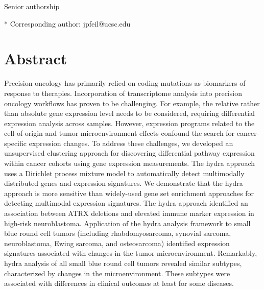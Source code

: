 \documentclass[10pt,letterpaper]{article}
\begin{document}
\begin{flushleft}
% 
%

\ddag Senior authorship




* Corresponding author: jpfeil@ucsc.edu

\end{flushleft}
\section*{Abstract}
Precision oncology has primarily relied on coding mutations as biomarkers of response to therapies. Incorporation of transcriptome analysis into precision oncology workflows has proven to be challenging. For example, the relative rather than absolute gene expression level needs to be considered, requiring differential expression analysis across samples. However, expression programs related to the cell-of-origin and tumor microenvironment effects confound the search for cancer-specific expression changes. To address these challenges, we developed an unsupervised clustering approach for discovering differential pathway expression within cancer cohorts using gene expression measurements. The hydra approach uses a Dirichlet process mixture model to automatically detect multimodally distributed genes and expression signatures. We demonstrate that the hydra approach is more sensitive than widely-used gene set enrichment approaches for detecting multimodal expression signatures. The hydra approach identified an association between ATRX deletions and elevated immune marker expression in high-risk neuroblastoma. Application of the hydra analysis framework to small blue round cell tumors (including rhabdomyosarcoma, synovial sarcoma, neuroblastoma, Ewing sarcoma, and osteosarcoma) identified expression signatures associated with changes in the tumor microenvironment. Remarkably, hydra analysis of all small blue round cell tumors revealed similar subtypes, characterized by changes in the microenvironment. These subtypes were associated with differences in clinical outcomes at least for some diseases.
\end{document}
